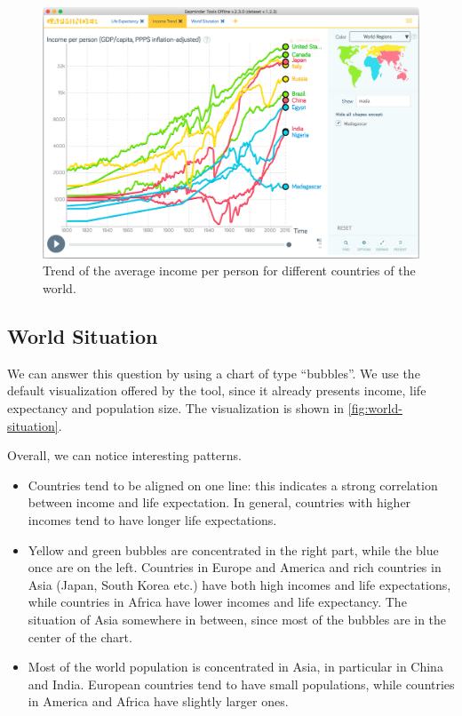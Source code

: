 \begin{figure}[h]
	\centering
	\includegraphics[width=0.95\columnwidth]{figures/income-trend}
	\caption{Trend of the average income per person for different countries of the world.}
	\label{fig:income-trend}
\end{figure}


\subsection{World Situation}
We can answer this question by using a chart of type ``bubbles''.
We use the default visualization offered by the tool, since it already presents income, life expectancy and population size.
The visualization is shown in \cref{fig:world-situation}.

Overall, we can notice interesting patterns.
\begin{itemize}
	\item Countries tend to be aligned on one line: this indicates a strong correlation between income and life expectation. In general, countries with higher incomes tend to have longer life expectations.
	\item Yellow and green bubbles are concentrated in the right part, while the blue once are on the left. Countries in Europe and America and rich countries in Asia (Japan, South Korea etc.) have both high incomes and life expectations, while countries in Africa have lower incomes and life expectancy. The situation of Asia somewhere in between, since most of the bubbles are in the center of the chart.
	\item Most of the world population is concentrated in Asia, in particular in China and India. European countries tend to have small populations, while countries in America and Africa have slightly larger ones.
\end{itemize}

